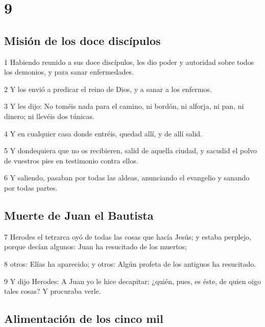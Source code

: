 \chapter{9}

\section*{Misión de los doce discípulos}

\par 1 Habiendo reunido a sus doce discípulos, les dio poder y autoridad sobre todos los demonios, y para sanar enfermedades.
\par 2 Y los envió a predicar el reino de Dios, y a sanar a los enfermos.
\par 3 Y les dijo: No toméis nada para el camino, ni bordón, ni alforja, ni pan, ni dinero; ni llevéis dos túnicas.
\par 4 Y en cualquier casa donde entréis, quedad allí, y de allí salid.
\par 5 Y dondequiera que no os recibieren, salid de aquella ciudad, y sacudid el polvo de vuestros pies en testimonio contra ellos.
\par 6 Y saliendo, pasaban por todas las aldeas, anunciando el evangelio y sanando por todas partes.

\section*{Muerte de Juan el Bautista}

\par 7 Herodes el tetrarca oyó de todas las cosas que hacía Jesús; y estaba perplejo, porque decían algunos: Juan ha resucitado de los muertos;
\par 8 otros: Elías ha aparecido; y otros: Algún profeta de los antiguos ha resucitado.
\par 9 Y dijo Herodes: A Juan yo le hice decapitar; ¿quién, pues, es éste, de quien oigo tales cosas? Y procuraba verle.

\section*{Alimentación de los cinco mil}


